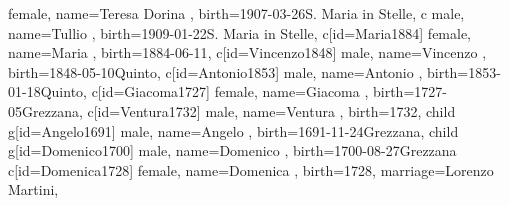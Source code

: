 \documentclass{article}
\begin{document}
\begin{midpage}
\begin{center}
\begin{genealogypicture}
{{{{{{{{{{{                                            female,
                                            name={Teresa Dorina },
                                            birth={1907-03-26}{S. Maria in Stelle},
                                        }
                                        c{
                                            male,
                                            name={Tullio },
                                            birth={1909-01-22}{S. Maria in Stelle},
                                        }
                                    }
                                    c[id=Maria1884]{
                                        female,
                                        name={Maria },
                                        birth={1884-06-11}{},
                                    }
                                }
                                c[id=Vincenzo1848]{
                                    male,
                                    name={Vincenzo },
                                    birth={1848-05-10}{Quinto},
                                }
                                c[id=Antonio1853]{
                                    male,
                                    name={Antonio },
                                    birth={1853-01-18}{Quinto},
                                }
                            }
                        }
                    }
                    c[id=Giacoma1727]{
                        female,
                        name={Giacoma },
                        birth={1727-05}{Grezzana},
                    }
                    c[id=Ventura1732]{
                        male,
                        name={Ventura },
                        birth={1732}{},
                    }
                }
                child{
                    g[id=Angelo1691]{
                        male,
                        name={Angelo },
                        birth={1691-11-24}{Grezzana},
                    }
                }
                child{
                    g[id=Domenico1700]{
                        male,
                        name={Domenico },
                        birth={1700-08-27}{Grezzana}
                    }
                    c[id=Domenica1728]{
                        female,
                        name={Domenica },
                        birth={1728}{},
                        marriage={Lorenzo Martini}{},
                    }
}}}}}
\end{genealogypicture}
\end{center}
\end{midpage}
\end{document}
